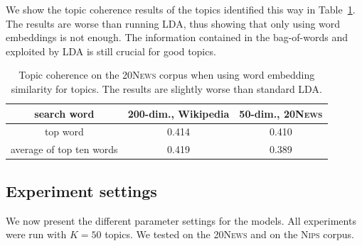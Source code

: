 \documentclass[
        a4paper,
        titlepage,
        twoside,
        parskip,
        numbers=noenddot
        ]{scrbook}
\newcommand{\ra}[1]{\renewcommand{\arraystretch}{#1}}
\theoremstyle{break}
\begin{document}
We show the topic coherence results of the topics identified this way in Table~\ref{table:raw_we_tm}.
The results are worse than running LDA, thus showing that only using word embeddings is not enough.
The information contained in the bag-of-words and exploited by LDA is still crucial for good topics.
\begin{table}[]
  \ra{1.3}
  \centering
  \caption{Topic coherence on the \textsc{20News} corpus when using word embedding similarity for topics. The results are slightly worse than standard LDA.}
  \label{table:raw_we_tm}
  \begin{tabular}{ccc}
    \toprule
    search word     & 200-dim., Wikipedia & 50-dim., \textsc{20News} \\
    \midrule
    top word                 & 0.414                        & 0.410                    \\
    average of top ten words & 0.419                        & 0.389 \\
    \bottomrule
  \end{tabular}
\end{table}

\subsection{Experiment settings}
\label{sec:tc_experiment_settings}

We now present the different parameter settings for the models.
All experiments were run with $K = 50$ topics.
We tested on the \textsc{20News} and on the \textsc{Nips} corpus.
\end{document}
